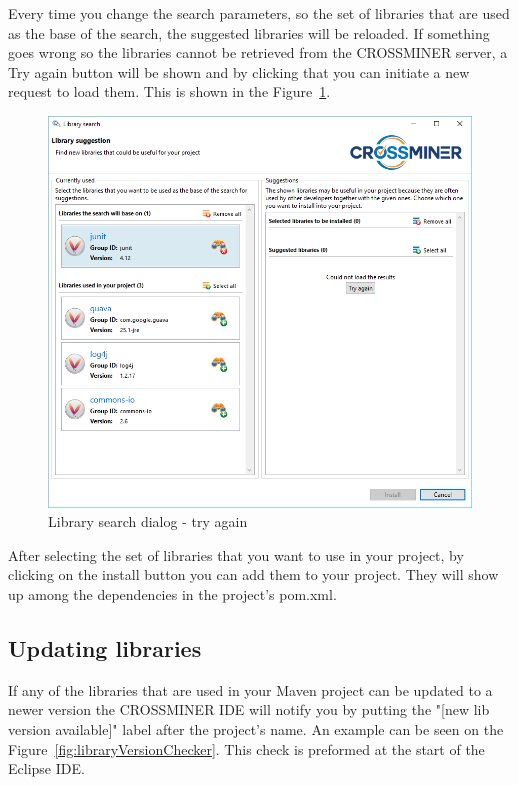\documentclass[11pt,a4paper]{book}
\begin{document}
Every time you change the search parameters, so the set of libraries that are used as the base of the search, the suggested libraries will be reloaded. If something goes wrong so the libraries cannot be retrieved from the CROSSMINER server, a Try again button will be shown and by clicking that you can initiate a new request to load them. This is shown in the Figure~\ref{fig:librarySearch:tryagain}.

\begin{figure}[h]
\centering
\includegraphics[width=\linewidth]{pic/library-search-try-again.png}
\caption{Library search dialog - try again}
\label{fig:librarySearch:tryagain}
\end{figure}

After selecting the set of libraries that you want to use in your project, by clicking on the install button you can add them to your project. They will show up among the dependencies in the project's pom.xml.

\subsection{Updating libraries}

If any of the libraries that are used in your Maven project can be updated to a newer version the CROSSMINER IDE will notify you by putting the "[new lib version available]" label after the project's name. An example can be seen on the Figure~\ref{fig:libraryVersionChecker}. This check is preformed at the start of the Eclipse IDE.
\end{document}
